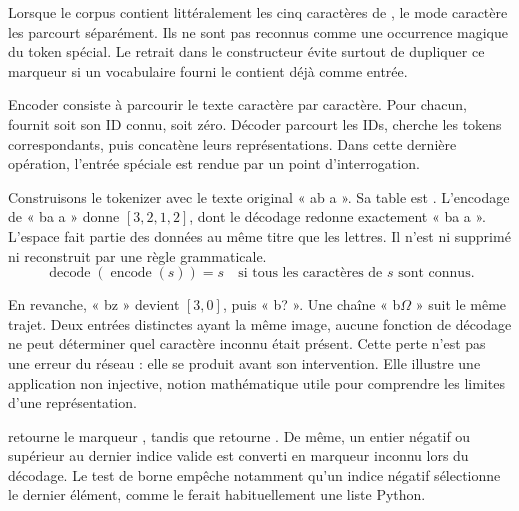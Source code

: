 Lorsque le corpus contient littéralement les cinq caractères de
, le mode caractère les parcourt séparément. Ils ne sont pas
reconnus comme une occurrence magique du token spécial.
Le retrait dans le constructeur évite surtout de dupliquer ce marqueur
si un vocabulaire fourni le contient déjà comme entrée.


Encoder consiste à parcourir le texte caractère par caractère. Pour chacun,
 fournit soit son ID connu, soit zéro.
Décoder parcourt les IDs, cherche les tokens correspondants, puis concatène
leurs représentations. Dans cette dernière opération, l'entrée spéciale
 est rendue par un point d'interrogation.

Construisons le tokenizer avec le texte original « ab a ».
Sa table est \code{['<unk>', ' ', 'a', 'b']}.
L'encodage de « ba a » donne \([3,2,1,2]\), dont le décodage redonne
exactement « ba a ». L'espace fait partie des données au même titre que les
lettres. Il n'est ni supprimé ni reconstruit par une règle grammaticale.
\[
    \operatorname{decode}(\operatorname{encode}(s))=s
    \quad\text{si tous les caractères de }s\text{ sont connus.}
\]

En revanche, « bz » devient \([3,0]\), puis « b? ».
Une chaîne « b\(\Omega\) » suit le même trajet. Deux entrées distinctes ayant la même
image, aucune fonction de décodage ne peut déterminer quel caractère inconnu
était présent. Cette perte n'est pas une erreur du réseau : elle se produit
avant son intervention. Elle illustre une application non injective,
notion mathématique utile pour comprendre les limites d'une représentation.

 retourne le marqueur ,
tandis que  retourne .
De même, un entier négatif ou supérieur au dernier indice valide est converti
en marqueur inconnu lors du décodage. Le test de borne empêche notamment
qu'un indice négatif sélectionne le dernier élément, comme le ferait
habituellement une liste Python.

